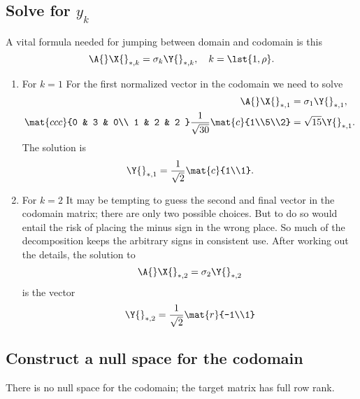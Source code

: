 \subsection{Solve for $y_{k}$}
A vital formula needed for jumping between domain and codomain is this
\begin{equation}
  \A{}\X{}_{*,k} = \sigma_{k} \Y{}_{*,k}, \quad k=\lst{1,\rho}.
  \label{eq:vital}
\end{equation}
\begin{enumerate}
\item For $k=1$
For the first normalized vector in the codomain we need to solve
\begin{equation}
  \begin{split}
    \A{}\X{}_{*,1} &= \sigma_{1} \Y{}_{*,1}, \\
    \mat{ccc}
    {0 & 3 & 0\\
     1 & 2 & 2
    }
    \frac{1}{\sqrt{30}}
    \mat{c}{1\\5\\2}
    & = 
    \sqrt{15} \Y{}_{*,1}.
  \end{split}
\end{equation}
The solution is
\begin{equation}
  \Y{}_{*,1} = \frac{1}{\sqrt{2}}\mat{c}{1\\1}.
\end{equation}
\item For $k=2$
It may be tempting to guess the second and final vector in the codomain matrix; there are only two possible choices. But to do so would entail the risk of placing the minus sign in the wrong place. So much of the decomposition keeps the arbitrary signs in consistent use. After working out the details, the solution to
\begin{equation}
  \A{}\X{}_{*,2} = \sigma_{2} \Y{}_{*,2}
\end{equation}
is the vector
\begin{equation}
  \Y{}_{*,2} = \frac{1}{\sqrt{2}}\mat{r}{-1\\1}
\end{equation}
\end{enumerate}

\subsection{Construct a null space for the codomain}
There is no null space for the codomain; the target matrix has full row rank.

